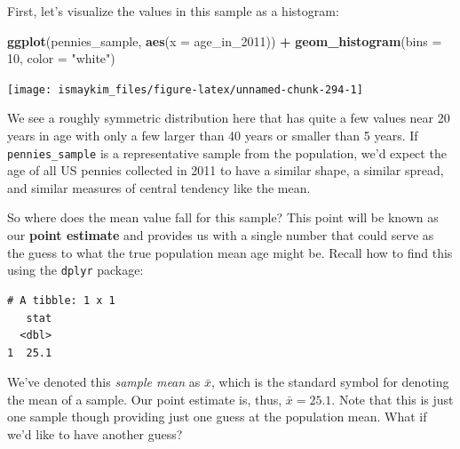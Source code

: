\documentclass[12pt,]{krantz}
\makeatletter
\newenvironment{Shaded}{\begin{snugshade}}{\end{snugshade}}
\newcommand{\KeywordTok}[1]{\textcolor[rgb]{0.27,0.27,0.27}{\textbf{#1}}}
\newcommand{\DataTypeTok}[1]{\textcolor[rgb]{0.27,0.27,0.27}{#1}}
\newcommand{\DecValTok}[1]{\textcolor[rgb]{0.06,0.06,0.06}{#1}}
\newcommand{\StringTok}[1]{\textcolor[rgb]{0.5,0.5,0.5}{#1}}
\newcommand{\OperatorTok}[1]{\textcolor[rgb]{0.43,0.43,0.43}{\textbf{#1}}}
\newcommand{\NormalTok}[1]{#1}
\newenvironment{kframe}{%
\medskip{}
\setlength{\fboxsep}{.8em}
 \def\at@end@of@kframe{}%
 \ifinner\ifhmode%
  \def\at@end@of@kframe{\end{minipage}}%
  \begin{minipage}{\columnwidth}%
 \fi\fi%
 \def\FrameCommand##1{\hskip\@totalleftmargin \hskip-\fboxsep
 \colorbox{shadecolor}{##1}\hskip-\fboxsep
     \hskip-\linewidth \hskip-\@totalleftmargin \hskip\columnwidth}%
 \MakeFramed {\advance\hsize-\width
   \@totalleftmargin\z@ \linewidth\hsize
   \@setminipage}}%
 {\par\unskip\endMakeFramed%
 \at@end@of@kframe}
\renewenvironment{Shaded}{\begin{kframe}}{\end{kframe}}
\makeatother
\begin{document}
First, let's visualize the values in this sample as a histogram:

\begin{Shaded}
\begin{Highlighting}[]
\KeywordTok{ggplot}\NormalTok{(pennies_sample, }\KeywordTok{aes}\NormalTok{(}\DataTypeTok{x =}\NormalTok{ age_in_}\DecValTok{2011}\NormalTok{)) }\OperatorTok{+}
\StringTok{  }\KeywordTok{geom_histogram}\NormalTok{(}\DataTypeTok{bins =} \DecValTok{10}\NormalTok{, }\DataTypeTok{color =} \StringTok{"white"}\NormalTok{)}
\end{Highlighting}
\end{Shaded}

\begin{center}\texttt{[image: ismaykim\_files/figure-latex/unnamed-chunk-294-1]} \end{center}

We see a roughly symmetric distribution here that has quite a few values
near 20 years in age with only a few larger than 40 years or smaller
than 5 years. If \texttt{pennies\_sample} is a representative sample
from the population, we'd expect the age of all US pennies collected in
2011 to have a similar shape, a similar spread, and similar measures of
central tendency like the mean.

So where does the mean value fall for this sample? This point will be
known as our \textbf{point estimate} and provides us with a single
number that could serve as the guess to what the true population mean
age might be. Recall how to find this using the \texttt{dplyr} package:

\begin{Shaded}
\end{Shaded}

\begin{verbatim}
# A tibble: 1 x 1
   stat
  <dbl>
1  25.1
\end{verbatim}

We've denoted this \emph{sample mean} as \(\bar{x}\), which is the
standard symbol for denoting the mean of a sample. Our point estimate
is, thus, \(\bar{x} = 25.1\). Note that this is just one sample though
providing just one guess at the population mean. What if we'd like to
have another guess?
\end{document}
